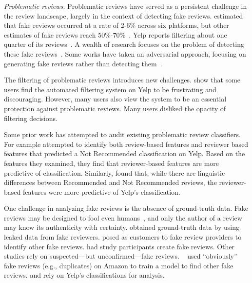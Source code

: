 \textit{Problematic reviews.} Problematic reviews have served as a persistent challenge in the review landscape, largely in the context of detecting fake reviews. \citet{ott2012estimating} estimated that fake reviews occurred at a rate of 2-6\% across six platforms, but other estimates of fake reviews reach 50\%-70\%~\cite{dwoskin2018merchants,elliott2018trust}. Yelp reports filtering about one quarter of its reviews~\cite{yelp2010recommend}. A wealth of research focuses on the problem of detecting these fake reviews~\cite{jindal2008opinion,martens2019towards,ye2016temporal,shehnepoor2017netspam,kumar2018rev2,harris2012detecting,mukherjee2013yelp}. Some works have taken an adversarial approach, focusing on generating fake reviews rather than detecting them~\cite{adelani2020generating,juuti2018stay,yao2017automated}.

The filtering of problematic reviews introduces new challenges. \citet{eslami2019user} show that some users find the automated filtering system on Yelp to be frustrating and discouraging. However, many users also view the system to be an essential protection against problematic reviews. Many users disliked the opacity of filtering decisions.

Some prior work has attempted to audit existing problematic review classifiers. For example \citet{kamerer2014understanding} attempted to identify both review-based features and reviewer based features that predicted a Not Recommended classification on Yelp. Based on the features they examined, they find that reviewer-based features are more predictive of classification. Similarly, \citet{mukherjee2013yelp} found that, while there are linguistic differences between Recommended and Not Recommended reviews, the reviewer-based features were more predictive of Yelp's classification.

One challenge in analyzing fake reviews is the absence of ground-truth data. Fake reviews may be designed to fool even humans~\cite{ott2011finding}, and only the author of a review may know its authenticity with certainty. \citet{wang2016real} obtained ground-truth data by using leaked data from fake reviewers. \citet{martens2019towards} posed as customers to fake review providers to identify other fake reviews. \citet{ott2011finding} had study participants create fake reviews. Other studies rely on suspected---but unconfirmed---fake reviews. ~\citet{jindal2008opinion} used ``obviously'' fake reviews (e.g., duplicates) on Amazon to train a model to find other fake reviews. \citet{mukherjee2013yelp} and \citet{rayana2015collective} rely on Yelp's classifications for analysis.

